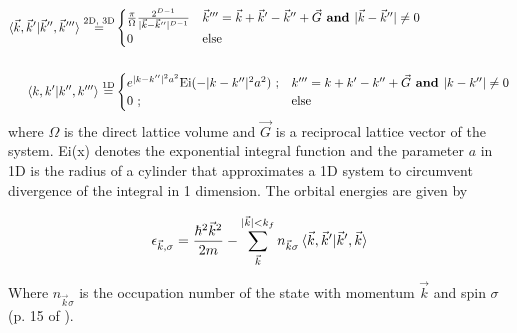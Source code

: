\documentclass{revtex4}
\begin{document}
    \begin{subequations}
    	\begin{align}
    	\braket{\vec{k}, \vec{k}' | \vec{k}'', \vec{k}'''} 
    	  \stackrel{ \text{2D, 3D} }{=}&
    	\begin{cases} 
    	\frac{\pi} {\Omega} \frac{ 2^{D-1} } { | \vec{k} - \vec{k}'' | ^ {D-1} } 
    	& \vec{k}''' = \vec{k} + \vec{k}' - \vec{k}'' + \vec{G} \textbf{ and } | \vec{k} - \vec{k}''| \neq 0 \\
    	0 
    	& \text{else}
    	\end{cases}
    	\\ \nonumber \\
    	\braket{k, k' | k'', k'''} \stackrel{\text{1D}}{=}&
    	\begin{cases} 
    	e ^ { |k-k''|^2a^2 } \text{Ei} (-|k - k''|^2 a^2)\text{ ;}
    	& k''' = k + k' - k'' + \vec{G} \textbf{ and } |k - k''| \neq 0 \\
    	0\text{ ;} 
    	& \text{else}
    	\end{cases}
    	\end{align}
    \end{subequations}
    where $\Omega$ is the direct lattice volume and $\vec{G}$ is a reciprocal lattice vector of the system. Ei(x) denotes the exponential integral function and the parameter $a$ in 1D is the radius of a cylinder that approximates a 1D system to circumvent divergence of the integral in 1 dimension. The orbital energies are given 
    by 
    
    \begin{equation}\label{eq:hf_orb_energy}
    \epsilon_{\vec{k},\sigma}=
    \frac{\hbar^2\vec{k}^2}{2m} - \sum\limits_{\vec{k}}^{|\vec{k}|< k_f}n_{\vec{k}\sigma}\braket{\vec{k}, \vec{k}' |\vec{k}', \vec{k}}
    \end{equation}
    
    Where $n_{\vec{k}\sigma}$ is the occupation number of the state with momentum $\vec{k}$ and spin $\sigma$ (p. 15 of \cite{Guiliani2005}). 
\end{document}
